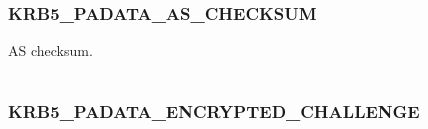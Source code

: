 \documentclass[letterpaper,10pt,english]{sphinxmanual}
\begin{document}
\begin{fulllineitems}
\label{appdev/refs/macros/KRB5_PADATA_AP_REQ:KRB5_PADATA_AP_REQ}
\end{fulllineitems}


\begin{tabulary}{\linewidth}{|L|L|}
\hline

 & 
\\\hline
\end{tabulary}



\subsubsection{KRB5\_PADATA\_AS\_CHECKSUM}
\label{appdev/refs/macros/KRB5_PADATA_AS_CHECKSUM:krb5-padata-as-checksum}\label{appdev/refs/macros/KRB5_PADATA_AS_CHECKSUM:krb5-padata-as-checksum-data}\label{appdev/refs/macros/KRB5_PADATA_AS_CHECKSUM::doc}

\begin{fulllineitems}
\label{appdev/refs/macros/KRB5_PADATA_AS_CHECKSUM:KRB5_PADATA_AS_CHECKSUM}
\end{fulllineitems}


AS checksum.

\begin{tabulary}{\linewidth}{|L|L|}
\hline

 & 
\\\hline
\end{tabulary}



\subsubsection{KRB5\_PADATA\_ENCRYPTED\_CHALLENGE}
\label{appdev/refs/macros/KRB5_PADATA_ENCRYPTED_CHALLENGE:krb5-padata-encrypted-challenge-data}\label{appdev/refs/macros/KRB5_PADATA_ENCRYPTED_CHALLENGE:krb5-padata-encrypted-challenge}\label{appdev/refs/macros/KRB5_PADATA_ENCRYPTED_CHALLENGE::doc}

\begin{fulllineitems}
\label{appdev/refs/macros/KRB5_PADATA_ENCRYPTED_CHALLENGE:KRB5_PADATA_ENCRYPTED_CHALLENGE}
\end{fulllineitems}
\end{document}
